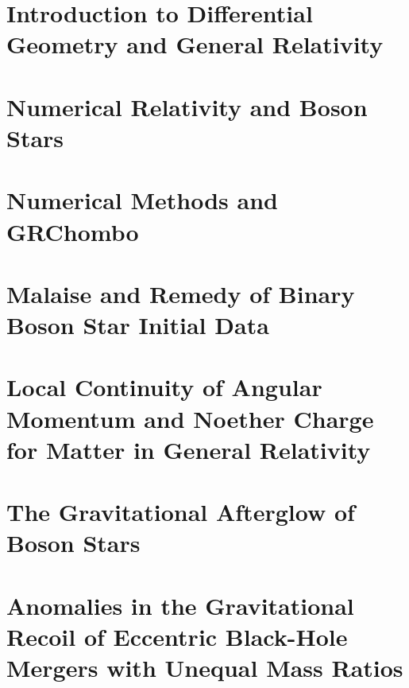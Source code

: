 \documentclass[11pt]{report}  %
\numberwithin{equation}{section}
\begin{document}
\newpage

\tableofcontents
\newpage
{}





\chapter{Introduction to Differential Geometry and General Relativity}












\chapter{Numerical Relativity and Boson Stars}






\chapter{Numerical Methods and {\sc GRChombo}}









 \chapter{Malaise and Remedy of Binary Boson Star Initial Data} \label{malaise}

 





 \chapter{Local Continuity of Angular Momentum and Noether Charge for
 Matter in General Relativity}




 \chapter{The Gravitational Afterglow of Boson Stars}

 

  \chapter{Anomalies in the Gravitational Recoil of Eccentric Black-Hole Mergers with Unequal
Mass Ratios}
\end{document}
